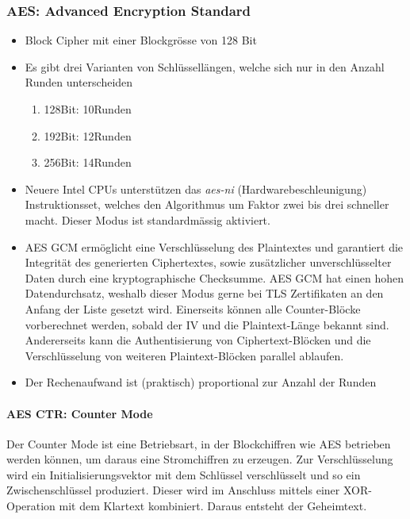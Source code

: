 \subsubsection{AES: Advanced Encryption Standard}
\begin{itemize}
	\item Block Cipher mit einer Blockgrösse von 128 Bit
	\item Es gibt drei Varianten von Schlüssellängen, welche sich nur in den Anzahl Runden unterscheiden
	\begin{enumerate}
		\item 128Bit: 10Runden
		\item 192Bit: 12Runden
		\item 256Bit: 14Runden
	\end{enumerate}
	\item Neuere Intel CPUs unterstützen das \textit{aes-ni} (Hardwarebeschleunigung) Instruktionsset, welches den Algorithmus um Faktor zwei bis drei schneller macht. Dieser Modus ist standardmässig aktiviert.
	\item AES GCM ermöglicht eine Verschlüsselung des Plaintextes und garantiert die Integrität des generierten Ciphertextes, sowie zusätzlicher unverschlüsselter Daten durch eine kryptographische Checksumme. AES GCM hat einen hohen Datendurchsatz, weshalb dieser Modus gerne bei TLS Zertifikaten an den Anfang der Liste gesetzt wird.  Einerseits können alle Counter-Blöcke vorberechnet werden, sobald der IV und die Plaintext-Länge bekannt sind. Andererseits kann die Authentisierung von Ciphertext-Blöcken und die Verschlüsselung von weiteren Plaintext-Blöcken parallel ablaufen.
	\item Der Rechenaufwand ist (praktisch) proportional zur Anzahl der Runden
\end{itemize}

\paragraph{AES CTR: Counter Mode}
Der Counter Mode ist eine Betriebsart, in der Blockchiffren wie AES betrieben werden können, um daraus eine Stromchiffren zu erzeugen. Zur Verschlüsselung wird ein Initialisierungsvektor mit dem Schlüssel verschlüsselt und so ein Zwischenschlüssel produziert. Dieser wird im Anschluss mittels einer XOR-Operation mit dem Klartext kombiniert. Daraus entsteht der Geheimtext.



